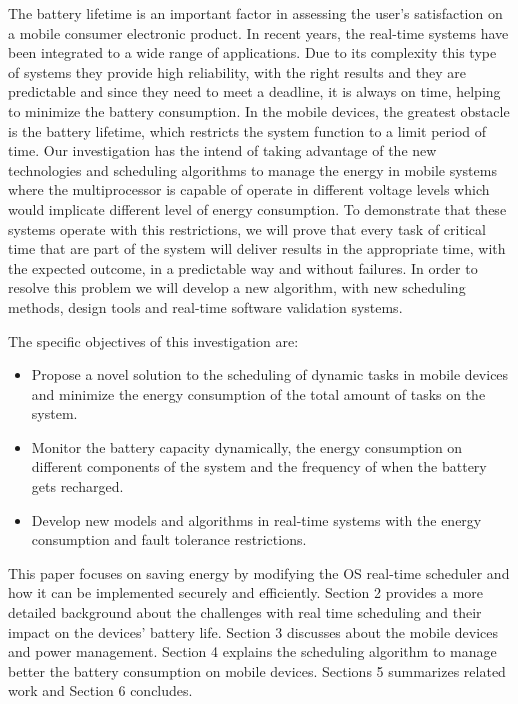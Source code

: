 \documentclass[conference]{IEEEtran}
\begin{document}
The battery lifetime is an important factor in assessing the user’s satisfaction on a mobile consumer electronic product. In recent years, the real-time systems have been integrated to a wide range of applications. Due to its complexity this type of systems they provide high reliability, with the right results and they are predictable and since they need to meet a deadline, it is always on time, helping to minimize the battery consumption.
In the mobile devices, the greatest obstacle is the battery lifetime, which restricts the system function to a limit period of time. 
Our investigation has the intend of taking advantage of the new technologies and scheduling algorithms to manage the energy in mobile systems where the multiprocessor is capable of operate in different voltage levels which would implicate different level of energy consumption.
To demonstrate that these systems operate with this restrictions, we will prove that every task of critical time that are part of the system will deliver results in the appropriate time, with the expected outcome, in a predictable way and without failures. 
In order to resolve this problem we will develop a new algorithm, with new scheduling methods, design tools and real-time software validation systems.

The specific objectives of this investigation are:
\begin{itemize}
\item Propose a novel solution to the scheduling of dynamic tasks in mobile devices and minimize the energy consumption of the total amount of tasks on the system.
\item Monitor the battery capacity dynamically, the energy consumption on different components of the system and the frequency of when the battery gets recharged.
\item Develop new models and algorithms in real-time systems with the energy consumption and fault tolerance restrictions.
\end{itemize}


This paper focuses on saving energy by modifying the OS real-time scheduler and how it can be implemented securely and efficiently. 
Section 2 provides a more detailed background about the challenges with real time scheduling and their impact on the devices' battery life. Section 3 discusses about the mobile devices and power management. Section 4 explains the scheduling algorithm to manage better the battery consumption on mobile devices. Sections 5 summarizes related work and Section 6 concludes.
\end{document}
